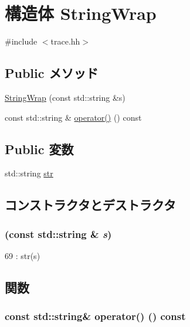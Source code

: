 \hypertarget{structStringWrap}{
\section{構造体 StringWrap}
\label{structStringWrap}
}


{\ttfamily \#include $<$trace.hh$>$}\subsection*{Public メソッド}
\begin{DoxyCompactItemize}
\item 
\hyperlink{structStringWrap_ad14377d3293ad123245c93f3247dfae8}{StringWrap} (const std::string \&s)
\item 
const std::string \& \hyperlink{structStringWrap_ae25726d670045eb7fea3500829f49596}{operator()} () const 
\end{DoxyCompactItemize}
\subsection*{Public 変数}
\begin{DoxyCompactItemize}
\item 
std::string \hyperlink{structStringWrap_a5d55e2558544e2ad2ea0b54f8e3d41fc}{str}
\end{DoxyCompactItemize}


\subsection{コンストラクタとデストラクタ}
\hypertarget{structStringWrap_ad14377d3293ad123245c93f3247dfae8}{
\subsubsection[{StringWrap}]{ (const std::string \& {\em s})}}
\label{structStringWrap_ad14377d3293ad123245c93f3247dfae8}



\begin{DoxyCode}
69 : str(s) {}
\end{DoxyCode}


\subsection{関数}
\hypertarget{structStringWrap_ae25726d670045eb7fea3500829f49596}{
\subsubsection[{operator()}]{\setlength{\rightskip}{0pt plus 5cm}const std::string\& operator() () const}}
\label{structStringWrap_ae25726d670045eb7fea3500829f49596}



